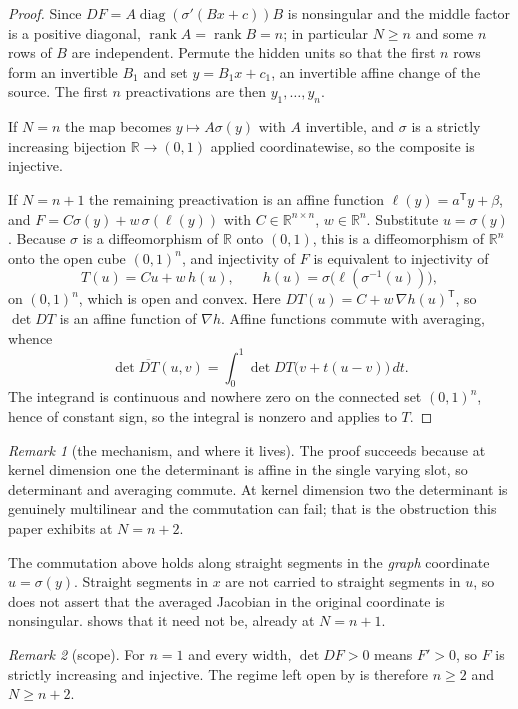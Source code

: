 \documentclass[11pt,twoside,leqno]{article}
\theoremstyle{plain}
\theoremstyle{definition}
\theoremstyle{remark}
\newtheorem{remark}[remark]{Remark}
\newcommand{\R}{\mathbb{R}}
\begin{document}
\begin{proof}
Since $DF=A\operatorname{diag}(\sigma'(Bx+c))B$ is nonsingular and the middle
factor is a positive diagonal, $\operatorname{rank}A=\operatorname{rank}B=n$;
in particular $N\ge n$ and some $n$ rows of $B$ are independent.  Permute the
hidden units so that the first $n$ rows form an invertible $B_1$ and set
$y=B_1x+c_1$, an invertible affine change of the source.  The first $n$
preactivations are then $y_1,\dots,y_n$.

If $N=n$ the map becomes $y\mapsto A\sigma(y)$ with $A$ invertible, and
$\sigma$ is a strictly increasing bijection $\R\to(0,1)$ applied
coordinatewise, so the composite is injective.

If $N=n+1$ the remaining preactivation is an affine function
$\ell(y)=a^{\mathsf T}y+\beta$, and
$F=C\sigma(y)+w\,\sigma(\ell(y))$ with $C\in\R^{n\times n}$, $w\in\R^n$.
Substitute $u=\sigma(y)$.  Because $\sigma$ is a diffeomorphism of $\R$ onto
$(0,1)$, this is a diffeomorphism of $\R^n$ onto the open cube $(0,1)^n$, and
injectivity of $F$ is equivalent to injectivity of
\[
 T(u)=Cu+w\,h(u),\qquad h(u)=\sigma\bigl(\ell(\sigma^{-1}(u))\bigr),
\]
on $(0,1)^n$, which is open and convex.  Here
$DT(u)=C+w\,\nabla h(u)^{\mathsf T}$, so $\det DT$ is an affine function of
$\nabla h$.  Affine functions commute with averaging, whence
\[
 \det\overline{DT}(u,v)=\int_0^1\det DT\bigl(v+t(u-v)\bigr)\,dt .
\]
The integrand is continuous and nowhere zero on the connected set $(0,1)^n$,
hence of constant sign, so the integral is nonzero and
 applies to $T$.
\end{proof}

\begin{remark}[the mechanism, and where it lives]\label{rmk:mechanism}
The proof succeeds because at kernel dimension one the determinant is affine
in the single varying slot, so determinant and averaging commute.  At kernel
dimension two the determinant is genuinely multilinear and the commutation can
fail; that is the obstruction this paper exhibits at $N=n+2$.

The commutation above holds along straight segments in the \emph{graph}
coordinate $u=\sigma(y)$.  Straight segments in $x$ are not carried to
straight segments in $u$, so  does not assert that the
averaged Jacobian in the original coordinate is nonsingular.
 shows that it need not be, already at $N=n+1$.
\end{remark}

\begin{remark}[scope]\label{rmk:scope}
For $n=1$ and every width, $\det DF>0$ means $F'>0$, so $F$ is strictly
increasing and injective.  The regime left open by  is
therefore $n\ge2$ and $N\ge n+2$.
\end{remark}
\end{document}
